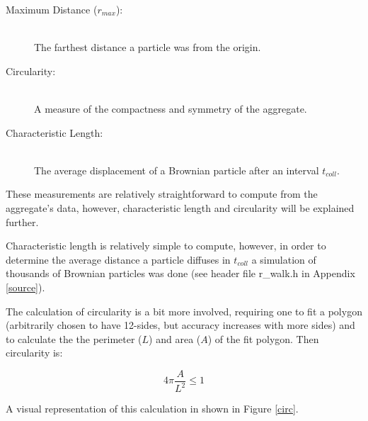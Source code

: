 \documentclass{article}
\begin{document}
\begin{appendix}
\begin{description}
	\item[Maximum Distance ($r_{max}$):] \hfill \\
	The farthest distance a particle was from the origin.
	
	\item[Circularity:] \hfill \\
	A measure of the compactness and symmetry of the aggregate.
	
	\item[Characteristic Length:] \hfill \\
	The average displacement of a Brownian particle after an interval $t_{coll}$.
	
\end{description}

\noindent These measurements are relatively straightforward to compute from the aggregate's data, however, characteristic length and circularity will be explained further.

Characteristic length is relatively simple to compute, however, in order to determine the average distance a particle diffuses in $t_{coll}$ a simulation of thousands of Brownian particles was done (see header file r\_walk.h in Appendix \ref{source}).

The calculation of circularity is a bit more involved, requiring one to fit a polygon (arbitrarily chosen to have 12-sides, but accuracy increases with more sides) and to calculate the the perimeter ($L$) and area ($A$) of the fit polygon. Then circularity is: 

\begin{equation}
	4\pi\frac{A}{L^2} \leq 1
\label{eq:circ}
\end{equation}

\noindent A visual representation of this calculation in shown in Figure \ref{circ}. 
\pagebreak



\end{appendix}
\end{document}
